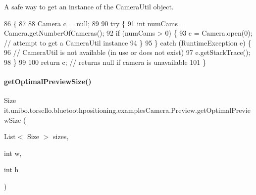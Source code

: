 A safe way to get an instance of the Camera\+Util object. 
\begin{DoxyCode}
86                                               \{
87 
88         Camera c = null;
89 
90         \textcolor{keywordflow}{try} \{
91             \textcolor{keywordtype}{int} numCams = Camera.getNumberOfCameras();
92             \textcolor{keywordflow}{if} (numCams > 0) \{
93                 c = Camera.open(0); \textcolor{comment}{// attempt to get a CameraUtil instance}
94             \}
95         \} \textcolor{keywordflow}{catch} (RuntimeException e) \{
96             \textcolor{comment}{// CameraUtil is not available (in use or does not exist)}
97             e.getStackTrace();
98         \}
99 
100         \textcolor{keywordflow}{return} c; \textcolor{comment}{// returns null if camera is unavailable}
101     \}
\end{DoxyCode}
\hypertarget{classit_1_1unibo_1_1torsello_1_1bluetoothpositioning_1_1examplesCamera_1_1Preview_a46718c866d8f8bc77c5efb98f38e8ad8_a46718c866d8f8bc77c5efb98f38e8ad8}{}\label{classit_1_1unibo_1_1torsello_1_1bluetoothpositioning_1_1examplesCamera_1_1Preview_a46718c866d8f8bc77c5efb98f38e8ad8_a46718c866d8f8bc77c5efb98f38e8ad8} 
\paragraph{\texorpdfstring{get\+Optimal\+Preview\+Size()}{getOptimalPreviewSize()}}
{\footnotesize\ttfamily Size it.\+unibo.\+torsello.\+bluetoothpositioning.\+examples\+Camera.\+Preview.\+get\+Optimal\+Preview\+Size (\begin{DoxyParamCaption}\item[{List$<$ Size $>$}]{sizes,  }\item[{int}]{w,  }\item[{int}]{h }\end{DoxyParamCaption})\hspace{0.3cm}{\ttfamily [private]}}



